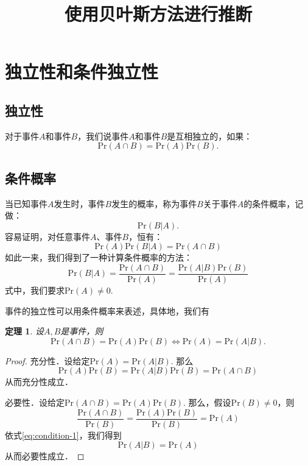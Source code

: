 \documentclass{ctexart}
\title{使用贝叶斯方法进行推断}
\newcommand{\pr}{\mathrm{Pr}}
\newtheorem{theorem}{定理}
\begin{document}
    \maketitle

    \section{独立性和条件独立性}

    \subsection{独立性}

    对于事件$A$和事件$B$，我们说事件$A$和事件$B$是互相独立的，如果：
    \begin{equation}
        \pr(A \cap B) = \pr(A) \pr(B).
    \end{equation}
    \subsection{条件概率}
    当已知事件$A$发生时，事件$B$发生的概率，称为事件$B$关于事件$A$的条件概率，记做：
    \begin{equation}
        \pr(B|A).
    \end{equation}
    容易证明，对任意事件$A$、事件$B$，恒有：
    \begin{equation}
        \pr(A)\pr(B|A) = \pr(A \cap B)
    \end{equation}
    如此一来，我们得到了一种计算条件概率的方法：
    \begin{equation}
        \pr(B|A) = \frac{\pr(A \cap B)}{\pr(A)} = \frac{\pr(A|B)\pr(B)}{\pr(A)}
        \label{eq:condition-1}
    \end{equation}
    式中，我们要求$\pr(A) \neq 0$.

    事件的独立性可以用条件概率来表述，具体地，我们有
    \begin{theorem}
        设$A,B$是事件，则
        \begin{equation}
        \pr(A \cap B) = \pr(A)\pr(B) \iff \pr(A) = \pr(A|B).
        \end{equation}
    \end{theorem}
    \begin{proof}
        充分性．设给定$\pr(A) = \pr(A|B)$. 那么
        \begin{equation}
            \pr(A)\pr(B) = \pr(A|B)\pr(B) = \pr(A\cap B)
        \end{equation}
        从而充分性成立．

        必要性．设给定$\pr(A\cap B) = \pr(A) \pr(B)$. 那么，假设$\pr(B) \neq 0$，则
        \begin{equation}
            \frac{\pr(A \cap B)}{\pr(B)} = \frac{\pr(A)\pr(B)}{\pr(B)} = \pr(A)
        \end{equation}
        依式\ref{eq:condition-1}，我们得到
        \begin{equation}
            \pr(A|B) = \pr(A)
        \end{equation}
        从而必要性成立．
    \end{proof}
\end{document}
